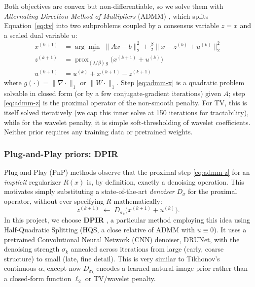\documentclass[12pt, a4paper, onecolumn]{article}
\theoremstyle{plain}          %
\theoremstyle{definition}     %
\theoremstyle{remark}
\begin{document}
Both objectives are convex but non-differentiable, so we solve them with
\textit{Alternating Direction Method of Multipliers} (ADMM) \cite{boydADMM}, which splits
Equation~\eqref{eq:tv} into two subproblems coupled by a consensus variable $z=x$ and a scaled dual variable $u$:
\begin{align}
    x^{(k+1)} &= \arg\min_x\; \|Ax-b\|_2^2 + \tfrac{\beta}{2}\|x-z^{(k)}+u^{(k)}\|_2^2 \label{eq:admm-x}\\
    z^{(k+1)} &= \operatorname{prox}_{(\lambda/\beta)\,g}\big(x^{(k+1)}+u^{(k)}\big) \label{eq:admm-z}\\
    u^{(k+1)} &= u^{(k)} + x^{(k+1)} - z^{(k+1)} \label{eq:admm-u}
\end{align}
where $g(\cdot)=\|\nabla\cdot\|_1$ or $\|W\cdot\|_1$. Step
\eqref{eq:admm-x} is a quadratic problem solvable in closed form (or by a
few conjugate-gradient iterations) given $A$; step \eqref{eq:admm-z} is the
proximal operator of the non-smooth penalty. For TV, this is itself
solved iteratively (we cap this inner solve at 150 iterations for tractability), while for the wavelet penalty, it is
simple soft-thresholding of wavelet coefficients. Neither prior requires any training data or pretrained weights.

\subsubsection{Plug-and-Play priors: DPIR}

Plug-and-Play (PnP) methods \cite{venkatakrishnan2013} observe that the
proximal step \eqref{eq:admm-z} for an \emph{implicit} regularizer
$R(x)$ is, by definition, exactly a denoising operation.
This motivates simply substituting a state-of-the-art \emph{denoiser} $D_\sigma$ for the proximal operator, without ever specifying $R$ mathematically:
\begin{equation}
    z^{(k+1)} \;\leftarrow\; D_{\sigma_k}\big(x^{(k+1)}+u^{(k)}\big).
    \label{eq:pnp}
\end{equation}
In this project, we choose \textbf{DPIR} \cite{dpir2021}, a particular method employing this idea using Half-Quadratic Splitting (HQS, a close relative of ADMM
with $u\equiv0$). It uses a pretrained Convolutional Neural Network (CNN) denoiser, DRUNet, with the denoising strength $\sigma_k$ annealed across iterations from large (early, coarse structure) to small (late, fine detail). This is very similar to Tikhonov's continuous $\alpha$, except now $D_{\sigma_k}$ encodes a learned natural-image prior rather than a closed-form function $\ell_2$ or TV/wavelet
penalty.
\end{document}
